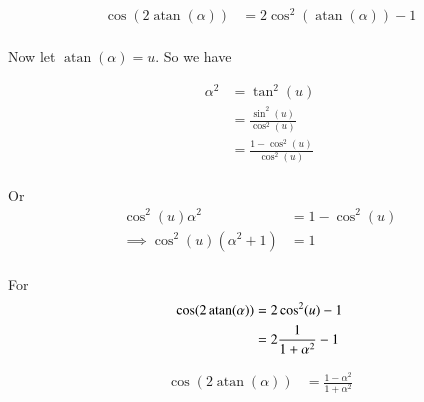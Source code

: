 \documentclass{article}
\DeclareMathOperator{\atan}{atan}
\begin{document}
\begin{align*}
\cos(2\atan(\alpha)) 
&= 
2 \cos^2\left( \atan(\alpha) \right) -1 \\
\end{align*}

Now let $\atan(\alpha) = u$.  So we have

\begin{align*}
\alpha^2 
&=
\tan^2(u)  \\
&=
\frac{\sin^2(u)}{\cos^2(u)} \\
&=
\frac{1 -\cos^2(u)}{\cos^2(u)} \\
\end{align*}

Or
\begin{align*}
\cos^2(u) \alpha^2 &= 1 - \cos^2(u) \\
\implies
\cos^2(u) (\alpha^2 +1 ) &= 1 \\
\end{align*}

For 
\begin{align*}
\cos(2\atan(\alpha)) 
&= 
2 \cos^2( u ) -1 \\
&= 
2 \inv{1 + \alpha^2} -1 \\
\end{align*}

\begin{align}\label{eqn:cosineTwiceArcTan}
\cos(2\atan(\alpha)) 
&= 
\frac{1 - \alpha^2}{1 + \alpha^2}
\end{align}



\end{document}
